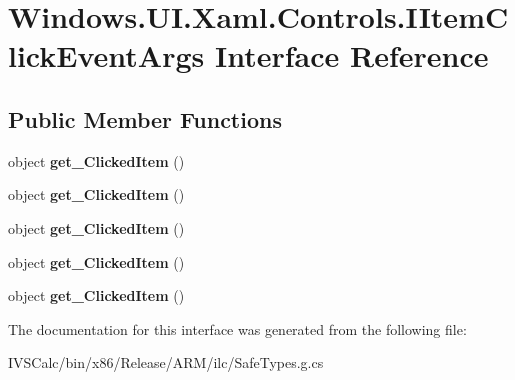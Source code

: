 \hypertarget{interface_windows_1_1_u_i_1_1_xaml_1_1_controls_1_1_i_item_click_event_args}{}\section{Windows.\+U\+I.\+Xaml.\+Controls.\+I\+Item\+Click\+Event\+Args Interface Reference}
\label{interface_windows_1_1_u_i_1_1_xaml_1_1_controls_1_1_i_item_click_event_args}
\subsection*{Public Member Functions}
\begin{DoxyCompactItemize}
\item 
\mbox{\label{interface_windows_1_1_u_i_1_1_xaml_1_1_controls_1_1_i_item_click_event_args_a45a494876802b52711febfbc25befab5}} 
object {\bfseries get\+\_\+\+Clicked\+Item} ()
\item 
\mbox{\label{interface_windows_1_1_u_i_1_1_xaml_1_1_controls_1_1_i_item_click_event_args_a45a494876802b52711febfbc25befab5}} 
object {\bfseries get\+\_\+\+Clicked\+Item} ()
\item 
\mbox{\label{interface_windows_1_1_u_i_1_1_xaml_1_1_controls_1_1_i_item_click_event_args_a45a494876802b52711febfbc25befab5}} 
object {\bfseries get\+\_\+\+Clicked\+Item} ()
\item 
\mbox{\label{interface_windows_1_1_u_i_1_1_xaml_1_1_controls_1_1_i_item_click_event_args_a45a494876802b52711febfbc25befab5}} 
object {\bfseries get\+\_\+\+Clicked\+Item} ()
\item 
\mbox{\label{interface_windows_1_1_u_i_1_1_xaml_1_1_controls_1_1_i_item_click_event_args_a45a494876802b52711febfbc25befab5}} 
object {\bfseries get\+\_\+\+Clicked\+Item} ()
\end{DoxyCompactItemize}


The documentation for this interface was generated from the following file\+:\begin{DoxyCompactItemize}
\item 
I\+V\+S\+Calc/bin/x86/\+Release/\+A\+R\+M/ilc/Safe\+Types.\+g.\+cs\end{DoxyCompactItemize}
